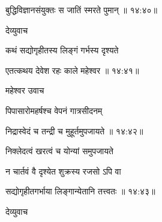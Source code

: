 
{\devanagarifont बुद्धिविज्ञानसंयुक्तः स जातिं स्मरते पुमान् {॥ १४:४०॥} \veg\dontdisplaylinenum }%

{\devanagarifont देव्युवाच {\dandab}\dontdisplaylinenum  }%
 
{\devanagarifont कथं सद्योगृहीतस्य लिङ्गं गर्भस्य दृश्यते \thinspace{\danda} \dontdisplaylinenum }%


{\devanagarifont एतत्कथय देवेश रहः काले महेश्वर {॥ १४:४१॥} \veg\dontdisplaylinenum }%

{\devanagarifont महेश्वर उवाच {\dandab}\dontdisplaylinenum  }%

{\devanagarifont पिपासारोमहर्षश्च वेपनं गात्रसीदनम् \thinspace{\danda} \dontdisplaylinenum }%


{\devanagarifont निद्रास्वेदं च तन्द्री च मुहूर्तमुपजायते {॥ १४:४२॥} \veg\dontdisplaylinenum }%

{\devanagarifont निक्लेदत्वं खरत्वं च योन्यां समुपजायते \thinspace{\dandab} \dontdisplaylinenum }%

{\devanagarifont न चार्तवं वै दृश्येत शुक्रस्य रजसो ऽपि वा  \danda\dontdisplaylinenum  }%


{\devanagarifont सद्योगृहीतगर्भाया लिङ्गान्येतानि तत्त्वतः {॥ १४:४३॥} \veg\dontdisplaylinenum }%
 
{\devanagarifont देव्युवाच {\dandab}\dontdisplaylinenum  }%
 

